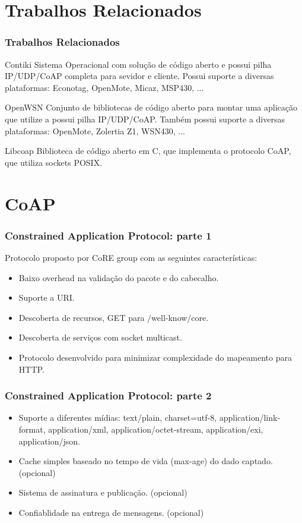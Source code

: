 \documentclass{beamer}
\begin{document}

\section{Trabalhos Relacionados}
\begin{frame}
\frametitle{Trabalhos Relacionados}
\begin{block}{Contiki}
Sistema Operacional com solução de código aberto e possui pilha IP/UDP/CoAP completa para sevidor e cliente.
Possui suporte a diversas plataformas: Econotag, OpenMote, Micaz, MSP430, ...
\end{block}

\begin{block}{OpenWSN}
Conjunto de bibliotecas de código aberto para montar uma aplicação que utilize a possui pilha IP/UDP/CoAP.
Também possui suporte a diversas plataformas: OpenMote, Zolertia Z1, WSN430, ...
\end{block}

\begin{block}{Libcoap}
Biblioteca de código aberto em C, que implementa o protocolo CoAP, que utiliza sockets POSIX.
\end{block}
\end{frame}


\section{CoAP}
\begin{frame}
\frametitle{Constrained Application Protocol: parte 1}
Protocolo proposto por CoRE group com as seguintes características:
\begin{itemize}
    \item Baixo overhead na validação do pacote e do cabecalho.
    \item Suporte a URI.
    \item Descoberta de recursos, GET para /well-know/core.
    \item Descoberta de serviços com socket multicast. 
    \item Protocolo desenvolvido para minimizar complexidade do mapeamento para HTTP.
\end{itemize}
\end{frame}

\begin{frame}
\frametitle{Constrained Application Protocol: parte 2}
\begin{itemize}
    \item Suporte a diferentes mídias: text/plain, charset=utf-8, application/link-format, application/xml, application/octet-stream, application/exi, application/json.
    \item Cache simples baseado no tempo de vida (max-age) do dado captado. (opcional)
    \item Sistema de assinatura e publicação. (opcional)
    \item Confiablidade na entrega de mensagens. (opcional) 
\end{itemize}
\end{frame}
\end{document}
